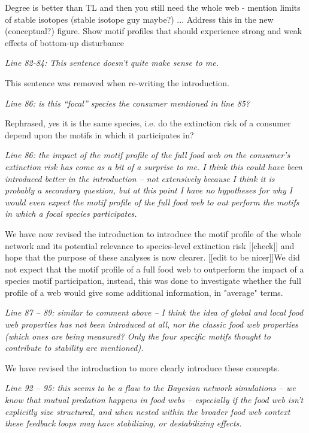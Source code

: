 \documentclass[12pt]{article}
\newcommand{\us}{\rm \setlength{\leftskip}{0.3cm} \setlength{\rightskip}{0.3cm}}
\newcommand{\them}{\it \setlength{\leftskip}{0cm} \setlength{\rightskip}{0cm}}
\begin{document}
\us Degree is better than TL and then you still need the whole web - mention limits of stable isotopes (stable isotope guy maybe?) ... Address this in the new (conceptual?) figure. Show motif profiles that should experience strong and weak effects of bottom-up disturbance 

\them
Line 82-84: This sentence doesn’t quite make sense to me.

\us
This sentence was removed when re-writing the introduction.

\them
Line 86: is this “focal” species the consumer mentioned in line 85?

\us
Rephrased, yes it is the same species, i.e. do the extinction risk of a consumer depend upon the motifs in which it participates in?

\them
Line 86: the impact of the motif profile of the full food web on the consumer’s extinction risk has come as a bit of a surprise to me. I think this could have been introduced better in the introduction – not extensively because I think it is probably a secondary question, but at this point I have no hypotheses for why I would even expect the motif profile of the full food web to out perform the motifs in which a focal species participates.

\us
We have now revised the introduction to introduce the motif profile of the whole network and its potential relevance to species-level extinction risk [[check]] and hope that the purpose of these analyses is now clearer.
[[edit to be nicer]]We did not expect that the motif profile of a full food web to outperform the impact of a species motif participation, instead, this was done to investigate whether the full profile of a web would give some additional information, in "average" terms. 



\them
Line 87 – 89: similar to comment above – I think the idea of global and local food web properties has not been introduced at all, nor the classic food web properties (which ones are being measured? Only the four specific motifs thought to contribute to stability are mentioned).

\us We have revised the introduction to more clearly introduce these concepts.

\them
Line 92 – 95: this seems to be a flaw to the Bayesian network simulations – we know that mutual predation happens in food webs – especially if the food web isn’t explicitly size structured, and when nested within the broader food web context these feedback loops may have stabilizing, or destabilizing effects.
\end{document}
